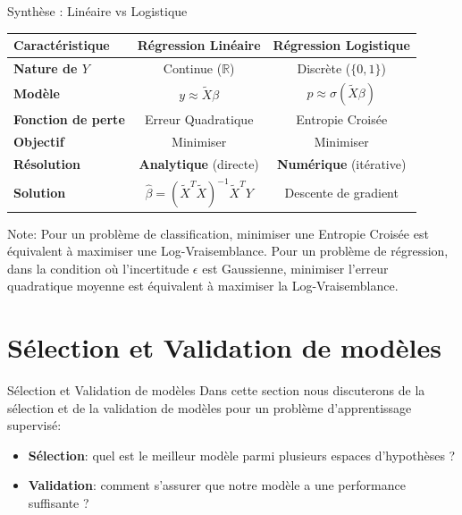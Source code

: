 \documentclass[10pt]{beamer}  %
\begin{document}
\begin{frame}{Synthèse : Linéaire vs Logistique}
	\begin{table}
		\renewcommand{\arraystretch}{1.5} %
		\begin{tabular}{|l|c|c|}
			\hline
			\textbf{Caractéristique} & \textbf{Régression Linéaire} & \textbf{Régression Logistique} \\ \hline
			\textbf{Nature de $Y$} & Continue ($\mathbb{R}$) & Discrète ($\{0, 1\}$) \\ \hline
			\textbf{Modèle} & $y \approx \tilde{X}\beta$ & $p \approx \sigma(\tilde{X}\beta)$ \\ \hline
			\textbf{Fonction de perte} & Erreur Quadratique & Entropie Croisée \\ \hline
			\textbf{Objectif} & Minimiser & Minimiser \\ \hline
			\textbf{Résolution} & \textbf{Analytique} (directe) & \textbf{Numérique} (itérative) \\ \hline
			\textbf{Solution} & $\hat{\beta} = (\tilde{X}^T\tilde{X})^{-1}\tilde{X}^TY$ & Descente de gradient \\ \hline
		\end{tabular}
	\end{table}
	Note: Pour un problème de classification, minimiser une Entropie Croisée est équivalent à maximiser une Log-Vraisemblance. Pour un problème de régression, dans la condition où l'incertitude $\epsilon$ est Gaussienne, minimiser l'erreur quadratique moyenne est équivalent à maximiser la Log-Vraisemblance.
\end{frame}



\section[Sélection et Validation de modèles]{Sélection et Validation de modèles}

\begin{frame}{Sélection et Validation de modèles}
	Dans cette section nous discuterons de la sélection et de la validation de modèles pour un problème d'apprentissage supervisé: \\
	\vspace{0.5cm}
	\begin{itemize}
		\item \textbf{Sélection}: quel est le meilleur modèle parmi plusieurs espaces d'hypothèses ?
		\item \textbf{Validation}: comment s'assurer que notre modèle a une performance suffisante ?
	\end{itemize}
\end{frame}
\end{document}
